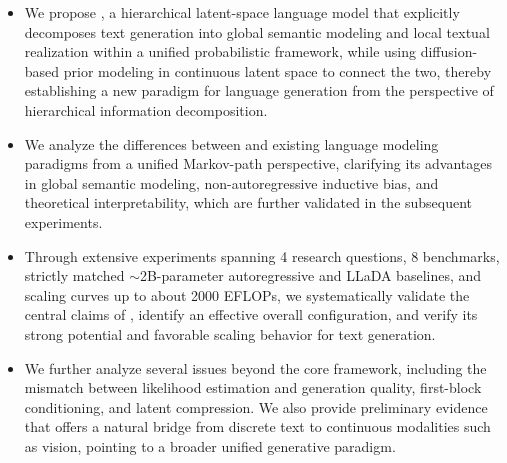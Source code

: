 \begin{itemize}
     \item We propose \method, a hierarchical latent-space language model that explicitly decomposes text generation into global semantic modeling and local textual realization within a unified probabilistic framework, while using diffusion-based prior modeling in continuous latent space to connect the two, thereby establishing a new paradigm for language generation from the perspective of hierarchical information decomposition.
    \item We analyze the differences between \method and existing language modeling paradigms from a unified Markov-path perspective, clarifying its advantages in global semantic modeling, non-autoregressive inductive bias, and theoretical interpretability, which are further validated in the subsequent experiments.
    \item Through extensive experiments spanning 4 research questions, 8 benchmarks, strictly matched $\sim$2B-parameter autoregressive and LLaDA baselines, and scaling curves up to about 2000 EFLOPs, we systematically validate the central claims of \method, identify an effective overall configuration, and verify its strong potential and favorable scaling behavior for text generation.
    \item We further analyze several issues beyond the core framework, including the mismatch between likelihood estimation and generation quality, first-block conditioning, and latent compression. We also provide preliminary evidence that \method offers a natural bridge from discrete text to continuous modalities such as vision, pointing to a broader unified generative paradigm.
\end{itemize}